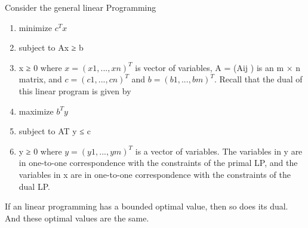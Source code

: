 \documentclass[usletter]{article}
\begin{document}
Consider the general linear Programming 
\begin{enumerate}
	\item minimize $c^{T}x$
	\item subject to Ax ≥ b
	\item x ≥ 0 where $x = (x1, . . . , xn)^T$ is vector of variables, A = (Aij ) is an m × n matrix, and $c = (c1, . . . , cn)^T$ and $b = (b1, . . . , bm)^T$. Recall that the dual of this linear program is given by
	\item maximize $b^{T}y$
	\item subject to AT y ≤ c
	\item y ≥ 0 where $y = (y1, . . . , ym)^T$ is a vector of variables. The variables in y are in one-to-one correspondence with the constraints of the primal LP, and the variables in x are in one-to-one correspondence with
the constraints of the dual LP.
\end{enumerate}

\begin{theorem}
If an linear programming has a bounded optimal value, then so does its dual. And these optimal values are the same.
\end{theorem}
\end{document}
